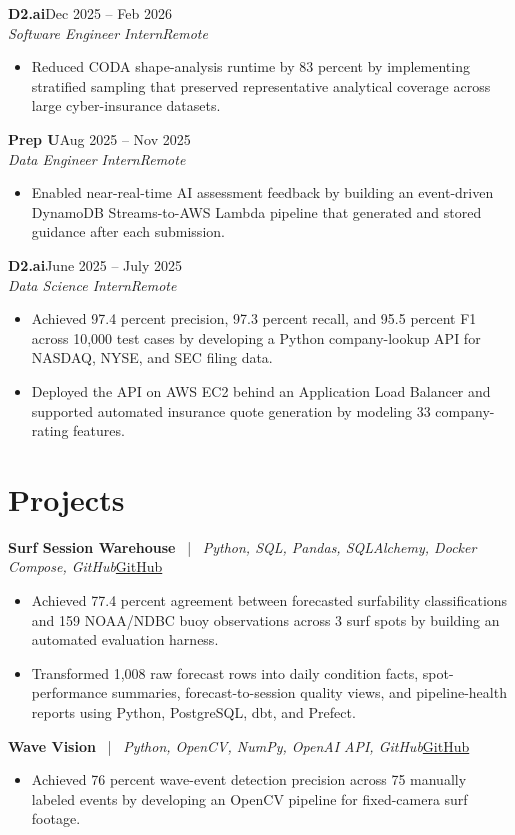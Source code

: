\documentclass[10.5pt]{article}
\newcommand{\entryline}[2]{%
\vspace{1pt}\textbf{#1}\hfill#2\\
}
\newcommand{\subline}[2]{%
\textit{#1}\hfill\textit{#2}\\[1pt]
}
\newcommand{\projline}[3]{%
\vspace{1pt}\textbf{#1} \ | \ \textit{#2}\hfill\href{#3}{GitHub}\\
}
\begin{document}
\entryline{D2.ai}{Dec 2025 -- Feb 2026}
\subline{Software Engineer Intern}{Remote}
\begin{itemize}
\item Reduced CODA shape-analysis runtime by 83 percent by implementing stratified sampling that preserved representative analytical coverage across large cyber-insurance datasets.
\end{itemize}

\entryline{Prep U}{Aug 2025 -- Nov 2025}
\subline{Data Engineer Intern}{Remote}
\begin{itemize}
\item Enabled near-real-time AI assessment feedback by building an event-driven DynamoDB Streams-to-AWS Lambda pipeline that generated and stored guidance after each submission.
\end{itemize}

\entryline{D2.ai}{June 2025 -- July 2025}
\subline{Data Science Intern}{Remote}
\begin{itemize}
\item Achieved 97.4 percent precision, 97.3 percent recall, and 95.5 percent F1 across 10,000 test cases by developing a Python company-lookup API for NASDAQ, NYSE, and SEC filing data.
\item Deployed the API on AWS EC2 behind an Application Load Balancer and supported automated insurance quote generation by modeling 33 company-rating features.
\end{itemize}

\section*{Projects}

\projline{Surf Session Warehouse}{Python, SQL, Pandas, SQLAlchemy, Docker Compose, GitHub}{https://github.com/ssmitty/surf-session-warehouse}
\begin{itemize}
\item Achieved 77.4 percent agreement between forecasted surfability classifications and 159 NOAA/NDBC buoy observations across 3 surf spots by building an automated evaluation harness.
\item Transformed 1,008 raw forecast rows into daily condition facts, spot-performance summaries, forecast-to-session quality views, and pipeline-health reports using Python, PostgreSQL, dbt, and Prefect.
\end{itemize}

\projline{Wave Vision}{Python, OpenCV, NumPy, OpenAI API, GitHub}{https://github.com/ssmitty/wave-tracker}
\begin{itemize}
\item Achieved 76 percent wave-event detection precision across 75 manually labeled events by developing an OpenCV pipeline for fixed-camera surf footage.
\end{itemize}
\end{document}
